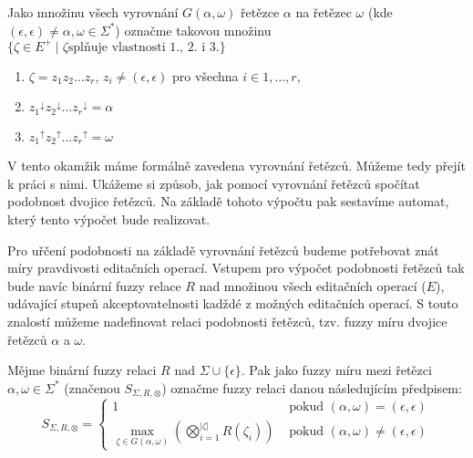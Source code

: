 \documentclass[a4paper,10pt]{article}
\begin{document}
\begin{definition}
 Jako množinu všech vyrovnání $G(\alpha, \omega)$ řetězce $\alpha$ na řetězec $\omega$ (kde $(\epsilon, \epsilon) \neq \alpha, \omega \in \Sigma^*$) označme takovou množinu $\{ \zeta \in E^+ \mid \zeta \text{splňuje vlastnosti 1., 2. i 3.}\}$
 \begin{enumerate}
  \item $\zeta = z_1 z_2 \dots z_r$, $z_i \neq (\epsilon, \epsilon)$ pro všechna $i \in 1, \dots, r$,
  \item ${z_1}^\downarrow {z_2}^\downarrow \dots {z_r}^\downarrow = \alpha$
  \item ${z_1}^\uparrow {z_2}^\uparrow \dots {z_r}^\uparrow = \omega$
 \end{enumerate}
\end{definition}

V tento okamžik máme formálně zavedena vyrovnání řetězců. Můžeme tedy přejít k práci s nimi. Ukážeme si způsob, jak pomocí vyrovnání řetězců spočítat podobnost dvojice řetězců. Na základě tohoto výpočtu pak sestavíme automat, který tento výpočet bude realizovat.

Pro uřčení podobnosti na základě vyrovnání řetězců budeme potřebovat znát míry pravdivosti editačních operací. Vstupem pro výpočet podobnosti řetězců tak bude navíc binární fuzzy relace $R$ nad množinou všech editačních operací ($E$), udávající stupeň akceptovatelnosti kadždé z možných editačních operací. S touto znalostí můžeme nadefinovat relaci podobnosti řetězců, tzv. fuzzy míru dvojice řetězců $\alpha$ a $\omega$.

 

\begin{definition}\label{def-FuzzMir}
 Mějme binární fuzzy relaci $R$ nad $\Sigma \cup \{\epsilon\}$. Pak jako fuzzy míru mezi řetězci $\alpha, \omega \in \Sigma^*$ (značenou $S_{\Sigma, R, \otimes}$) označme fuzzy relaci danou následujícím předpisem:
 $$
 S_{\Sigma, R, \otimes} = 
  \begin{cases}
   1	&	\text{ pokud } (\alpha, \omega) = (\epsilon, \epsilon) \\
   \max\limits_{\zeta \in G(\alpha, \omega)} (\bigotimes_{i = 1}^{|\zeta|} R(\zeta_i) )	&	\text{ pokud } (\alpha, \omega) \neq (\epsilon, \epsilon) 
  \end{cases}
 $$
\end{definition}
\end{document}
